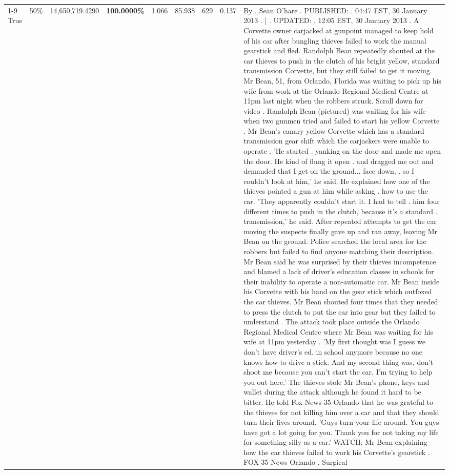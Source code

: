 \begin{table}[H]
\begin{tabular}{lllrlllll}
\cline{1-9} \cline{2-9}
True & 50\% & 14,650,719.4290 & \bfseries \color{red} 100.0000\% & 1.066 & 85.938 & 629 & 0.137 & By . Sean O'hare . PUBLISHED: . 04:47 EST, 30 January 2013 . | . UPDATED: . 12:05 EST, 30 January 2013 . A Corvette owner carjacked at gunpoint managed to keep hold of his car after bungling thieves failed to work the manual gearstick and fled. Randolph Bean repeatedly shouted at the car thieves to push in the clutch of his bright yellow, standard transmission Corvette, but they still failed to get it moving. Mr Bean, 51, from Orlando, Florida was waiting to pick up his wife from work at the Orlando Regional Medical Centre at 11pm last night when the robbers struck. Scroll down for video . Randolph Bean (pictured) was waiting for his wife when two gunmen tried and failed to start his yellow Corvette . Mr Bean's canary yellow Corvette which has a standard transmission gear shift which the carjackers were unable to operate . 'He started . yanking on the door and made me open the door. He kind of flung it open . and dragged me out and demanded that I get on the ground... face down, . so I couldn't look at him,' he said. He explained how one of the thieves pointed a gun at him while asking . how to use the car. 'They apparently couldn't start it. I had to tell . him four different times to push in the clutch, because it's a standard . transmission,' he said. After repeated attempts to get the car moving the suspects finally gave up and ran away, leaving Mr Bean on the ground. Police searched the local area for the robbers but failed to find anyone matching their description. Mr Bean said he was surprised by their thieves incompetence and blamed a lack of driver's education classes in schools for their inability to operate a non-automatic car. Mr Bean inside his Corvette with his hand on the gear stick which outfoxed the car thieves. Mr Bean shouted four times that they needed to press the clutch to put the car into gear but they failed to understand . The attack took place outside the Orlando Regional Medical Centre where Mr Bean was waiting for his wife at 11pm yesterday . 'My first thought was I guess we don't have driver's ed. in school anymore because no one knows how to drive a stick. And my second thing was, don't shoot me because you can't start the car. I'm trying to help you out here.' The thieves stole Mr Bean's phone, keys and wallet during the attack although he found it hard to be bitter. He told Fox News 35 Orlando that he was grateful to the thieves for not killing him over a car and that they should turn their lives around. 'Guys turn your life around. You guys have got a lot going for you. Thank you for not taking my life for something silly as a car.' WATCH: Mr Bean explaining how the car thieves failed to work his Corvette's gearstick . FOX 35 News Orlando . Surgical \\

\end{tabular}
\end{table}
